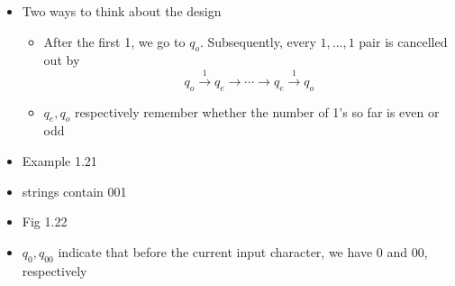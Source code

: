 \begin{frame}[allowframebreaks]
\begin{itemize}
\item Two ways to think about the design
  \begin{itemize}
  \item After the first 1, we go to $q_o$. Subsequently, every $1, \ldots, 1$ pair is cancelled out by
  \begin{equation*}
q_o \xrightarrow{1} q_e \rightarrow \cdots \rightarrow q_e
    \xrightarrow{1} q_o
  \end{equation*}
\item $q_e, q_o$ respectively remember whether the number of 1's
  so far is even or odd
  \end{itemize}
\item Example 1.21
  
\item [] strings contain 001

\item [] Fig 1.22

\begin{center}
    \end{center}
  \item $q_0, q_{00}$ indicate that before the current input character,
    we have 0 and 00, respectively
  \end{itemize}\end{frame}


